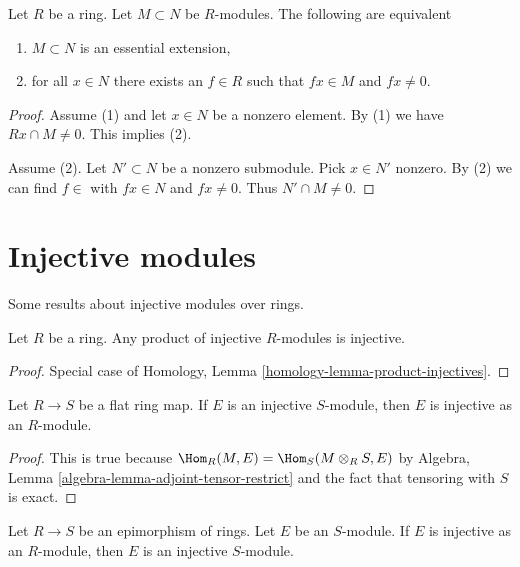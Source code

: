 \begin{lemma}
\label{lemma-essential-extension}
Let $R$ be a ring. Let $M \subset N$ be $R$-modules. The following
are equivalent
\begin{enumerate}
\item $M \subset N$ is an essential extension,
\item for all $x \in N$ there exists an $f \in R$ such that $fx \in M$
and $fx \not = 0$.
\end{enumerate}
\end{lemma}

\begin{proof}
Assume (1) and let $x \in N$ be a nonzero element. By (1) we have
$Rx \cap M \not = 0$. This implies (2).

\medskip\noindent
Assume (2). Let $N' \subset N$ be a nonzero submodule. Pick $x \in N'$
nonzero. By (2) we can find $f \in $ with $fx \in N$ and $fx \not = 0$.
Thus $N' \cap M \not = 0$.
\end{proof}




\section{Injective modules}
\label{section-injective-modules}

\noindent
Some results about injective modules over rings.

\begin{lemma}
\label{lemma-product-injectives}
Let $R$ be a ring. Any product of injective $R$-modules is injective.
\end{lemma}

\begin{proof}
Special case of Homology, Lemma \ref{homology-lemma-product-injectives}.
\end{proof}

\begin{lemma}
\label{lemma-injective-flat}
Let $R \to S$ be a flat ring map. If $E$ is an injective $S$-module,
then $E$ is injective as an $R$-module.
\end{lemma}

\begin{proof}
This is true because $\Hom_R(M, E) = \Hom_S(M \otimes_R S, E)$
by Algebra, Lemma \ref{algebra-lemma-adjoint-tensor-restrict}
and the fact that tensoring with $S$ is exact.
\end{proof}

\begin{lemma}
\label{lemma-injective-epimorphism}
Let $R \to S$ be an epimorphism of rings. Let $E$ be an $S$-module.
If $E$ is injective as an $R$-module, then $E$ is an injective $S$-module.
\end{lemma}

